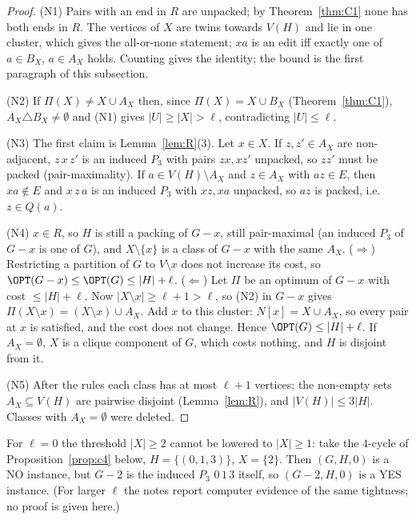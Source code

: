 \begin{proof}
(N1) Pairs with an end in $R$ are unpacked; by Theorem~\ref{thm:C1} none has both ends in $R$. The vertices of $X$ are twins towards $V(H)$ and lie in one cluster, which gives the all-or-none statement; $xa$ is an edit iff exactly one of $a\in B_X$, $a\in A_X$ holds. Counting gives the identity; the bound is the first paragraph of this subsection.

(N2) If $\Pi(X)\ne X\cup A_X$ then, since $\Pi(X)=X\cup B_X$ (Theorem~\ref{thm:C1}), $A_X\triangle B_X\neq\emptyset$ and (N1) gives $|U|\ge|X|>\ell$, contradicting $|U|\le\ell$.

(N3) The first claim is Lemma~\ref{lem:R}(3). Let $x\in X$. If $z,z'\in A_X$ are non-adjacent, $z\,x\,z'$ is an induced $P_3$ with pairs $zx,xz'$ unpacked, so $zz'$ must be packed (pair-maximality). If $a\in V(H)\setminus A_X$ and $z\in A_X$ with $az\in E$, then $xa\notin E$ and $x\,z\,a$ is an induced $P_3$ with $xz,xa$ unpacked, so $az$ is packed, i.e.\ $z\in Q(a)$.

(N4) $x\in R$, so $H$ is still a packing of $G-x$, still pair-maximal (an induced $P_3$ of $G-x$ is one of $G$), and $X\setminus\{x\}$ is a class of $G-x$ with the same $A_X$. ($\Rightarrow$) Restricting a partition of $G$ to $V\setminus x$ does not increase its cost, so $\OPT(G-x)\le\OPT(G)\le|H|+\ell$. ($\Leftarrow$) Let $\Pi$ be an optimum of $G-x$ with cost $\le|H|+\ell$. Now $|X\setminus x|\ge\ell+1>\ell$, so (N2) in $G-x$ gives $\Pi(X\setminus x)=(X\setminus x)\cup A_X$. Add $x$ to this cluster: $N[x]=X\cup A_X$, so every pair at $x$ is satisfied, and the cost does not change. Hence $\OPT(G)\le|H|+\ell$. If $A_X=\emptyset$, $X$ is a clique component of $G$, which costs nothing, and $H$ is disjoint from it.

(N5) After the rules each class has at most $\ell+1$ vertices; the non-empty sets $A_X\subseteq V(H)$ are pairwise disjoint (Lemma~\ref{lem:R}), and $|V(H)|\le3|H|$. Classes with $A_X=\emptyset$ were deleted.
\end{proof}

\begin{remark}
For $\ell=0$ the threshold $|X|\ge2$ cannot be lowered to $|X|\ge1$: take the $4$-cycle of Proposition~\ref{prop:c4} below, $H=\{(0,1,3)\}$, $X=\{2\}$. Then $(G,H,0)$ is a NO instance, but $G-2$ is the induced $P_3$ $0\,1\,3$ itself, so $(G-2,H,0)$ is a YES instance. (For larger $\ell$ the notes report computer evidence of the same tightness; no proof is given here.)
\end{remark}

